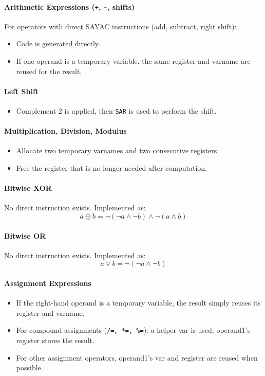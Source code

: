 \documentclass[12pt,a4paper]{report}
\begin{document}
\paragraph{Arithmetic Expressions (\texttt{+}, \texttt{-}, shifts)}  
For operators with direct SAYAC instructions (add, subtract, right shift):  
\begin{itemize}
    \item Code is generated directly.  
    \item If one operand is a temporary variable, the same register and varname are reused for the result.
\end{itemize}

\paragraph{Left Shift}  
\begin{itemize}
    \item Complement 2 is applied, then \texttt{SAR} is used to perform the shift.
\end{itemize}

\paragraph{Multiplication, Division, Modulus}  
\begin{itemize}
    \item Allocate two temporary varnames and two consecutive registers.  
    \item Free the register that is no longer needed after computation.
\end{itemize}

\paragraph{Bitwise XOR}  
No direct instruction exists. Implemented as:  
\[
a \oplus b = \lnot (\lnot a \land \lnot b) \land \lnot (a \land b)
\]

\paragraph{Bitwise OR}  
No direct instruction exists. Implemented as:  
\[
a \lor b = \lnot (\lnot a \land \lnot b)
\]

\paragraph{Assignment Expressions}  
\begin{itemize}
    \item If the right-hand operand is a temporary variable, the result simply reuses its register and varname.  
    \item For compound assignments (\texttt{/=, *=, \%=}): a helper var is used; operand1’s register stores the result.  
    \item For other assignment operators, operand1’s var and register are reused when possible.
\end{itemize}
\end{document}

